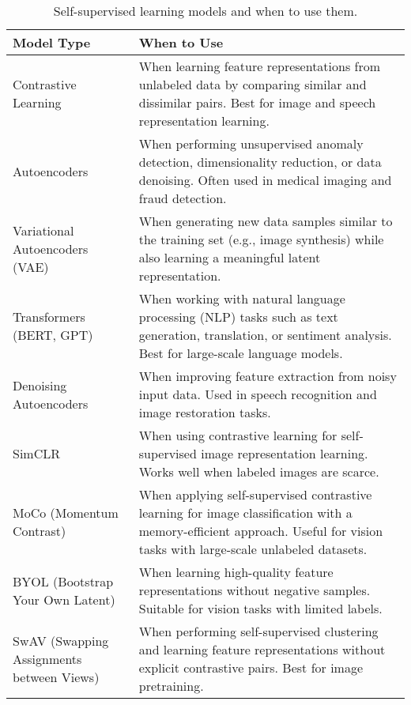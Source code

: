 \documentclass[12pt,openany]{book}
\begin{document}
\begin{table}[H]
    \centering
    \small
    \renewcommand{\arraystretch}{1.3} %
    \begin{tabular}{|l|p{8cm}|}
        \hline
        \textbf{Model Type} & \textbf{When to Use} \\
        \hline
        Contrastive Learning & When learning feature representations from unlabeled data by comparing similar and dissimilar pairs. Best for image and speech representation learning. \\
        \hline
        Autoencoders & When performing unsupervised anomaly detection, dimensionality reduction, or data denoising. Often used in medical imaging and fraud detection. \\
        \hline
        Variational Autoencoders (VAE) & When generating new data samples similar to the training set (e.g., image synthesis) while also learning a meaningful latent representation. \\
        \hline
        Transformers (BERT, GPT) & When working with natural language processing (NLP) tasks such as text generation, translation, or sentiment analysis. Best for large-scale language models. \\
        \hline
        Denoising Autoencoders & When improving feature extraction from noisy input data. Used in speech recognition and image restoration tasks. \\
        \hline
        SimCLR & When using contrastive learning for self-supervised image representation learning. Works well when labeled images are scarce. \\
        \hline
        MoCo (Momentum Contrast) & When applying self-supervised contrastive learning for image classification with a memory-efficient approach. Useful for vision tasks with large-scale unlabeled datasets. \\
        \hline
        BYOL (Bootstrap Your Own Latent) & When learning high-quality feature representations without negative samples. Suitable for vision tasks with limited labels. \\
        \hline
        SwAV (Swapping Assignments between Views) & When performing self-supervised clustering and learning feature representations without explicit contrastive pairs. Best for image pretraining. \\
        \hline
    \end{tabular}
    \caption{Self-supervised learning models and when to use them.}
\end{table}
\end{document}
